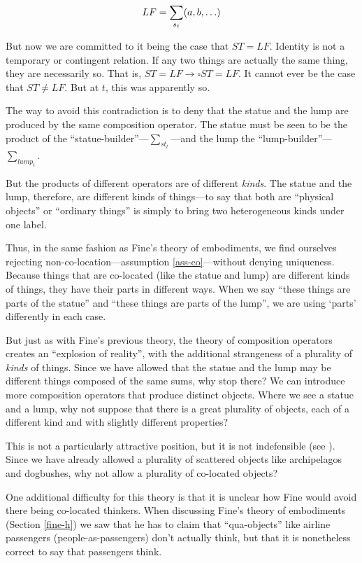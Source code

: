\documentclass[11pt]{article}
\begin{document}
\begin{spacing}{1.5}
\begin{displaymath}
LF = \sum_{s_t} (a, b, \mathellipsis )
\end{displaymath}

But now we are committed to it being the case that $ST = LF$.
Identity is not a temporary or contingent relation.  If any two things
are actually the same thing, they are necessarily so.  That is, $ST =
LF \rightarrow \square ST = LF$.  It cannot ever be the case that $ST
\neq LF$.  But at $t$, this was apparently so.

The way to avoid this contradiction is to deny that the statue and the
lump are produced by the same composition operator.  The statue must
be seen to be the product of the ``statue-builder''---$\sum
_{st_t}$---and the lump the ``lump-builder''---$\sum _{lump_t}$.

But the products of different operators are of different {\em kinds}.
The statue and the lump, therefore, are different kinds of things---to
say that both are ``physical objects'' or ``ordinary things'' is
simply to bring two heterogeneous kinds under one label.

Thus, in the same fashion as Fine's theory of embodiments, we find
ourselves rejecting non-co-location---assumption
\ref{ass-co}---without denying uniqueness.  Because things that are
co-located (like the statue and lump) are different kinds of things,
they have their parts in different ways.  When we say ``these things
are parts of the statue'' and ``these things are parts of the lump'',
we are using `parts' differently in each case.

But just as with Fine's previous theory, the theory of composition
operators creates an ``explosion of reality'', with the additional
strangeness of a plurality of {\em kinds} of things.  Since we have
allowed that the statue and the lump may be different things composed
of the same sums, why stop there?  We can introduce more composition
operators that produce distinct objects.  Where we see a statue and a
lump, why not suppose that there is a great plurality of objects, each
of a different kind and with slightly different properties?

This is not a particularly attractive position, but it is not
indefensible (see \citet[Section 4]{bennett2004}).  Since we have
already allowed a plurality of scattered objects like archipelagos and
dogbushes, why not allow a plurality of co-located objects?

One additional difficulty for this theory is that it is unclear how
Fine would avoid there being co-located thinkers.  When discussing
Fine's theory of embodiments (Section \ref{fine-h}) we saw that he has
to claim that ``qua-objects'' like airline passengers
(people-as-passengers) don't actually think, but that it is
nonetheless correct to say that passengers think.


\end{spacing}
\end{document}
